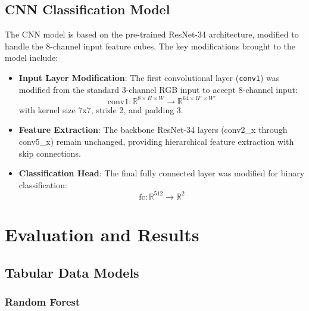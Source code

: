 \documentclass[12pt,a4paper]{article}
\begin{document}
\subsection{CNN Classification Model}

The CNN model is based on the pre-trained ResNet-34 architecture, modified to
handle the 8-channel input feature cubes. The key modifications brought to the
model include:

\begin{itemize}
    \item \textbf{Input Layer Modification}: The first convolutional layer
    (\texttt{conv1}) was modified from the standard 3-channel RGB input to
    accept 8-channel input:
    \begin{equation}
        \text{conv1}: \mathbb{R}^{8 \times H \times W}
                      \rightarrow \mathbb{R}^{64 \times H' \times W'}
    \end{equation}
    with kernel size 7x7, stride 2, and padding 3.
    
    \item \textbf{Feature Extraction}: The backbone ResNet-34 layers
    (conv2\_x through conv5\_x) remain unchanged, providing hierarchical
    feature extraction with skip connections.
    
    \item \textbf{Classification Head}: The final fully connected layer was
    modified for binary classification:
    \begin{equation}
        \text{fc}: \mathbb{R}^{512} \rightarrow \mathbb{R}^{2}
    \end{equation}
\end{itemize}

\section{Evaluation and Results}

\subsection{Tabular Data Models}

\subsubsection{Random Forest}
\end{document}
